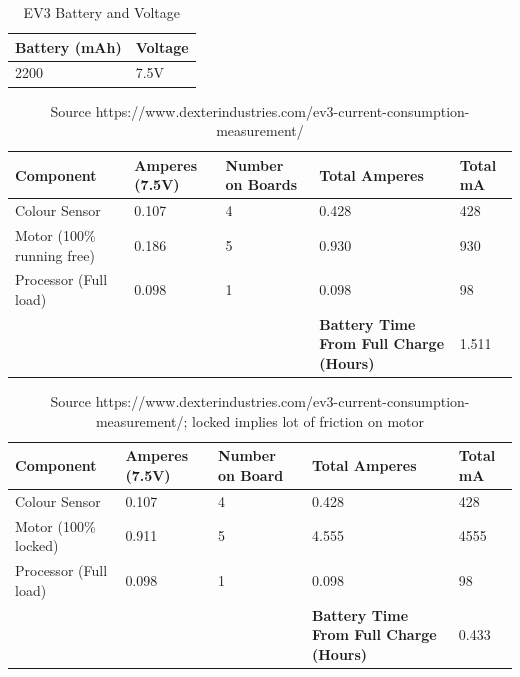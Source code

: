 \documentclass[a4paper]{article}
\begin{document}
\begin{center}
\newpage
\begin{table}[!htb]
\centering
\begin{tabular}{| p{2cm} | p{2cm} |}
\hline
\textbf{Battery (mAh)} & \textbf{Voltage} \\
\hline
2200 & 7.5V \\
\hline
\end{tabular}
\caption{EV3 Battery and Voltage}
\end{table}

\begin{table}[!htb]
\centering
\begin{tabular}{| p{2cm} | p{2cm} | p{2cm} | p{2cm} | p{2cm} |}
\hline
\textbf{Component} & \textbf{Amperes (7.5V)} & \textbf{Number on Boards} & \textbf{Total Amperes} & \textbf{Total mA}\\
\hline
Colour Sensor & 0.107 & 4 & 0.428 & 428 \\
\hline
Motor (100\% running free) & 0.186 & 5 & 0.930 & 930 \\
\hline 
Processor (Full load) & 0.098 & 1 & 0.098 & 98 \\
\hline
 & & & \textbf{Battery Time From Full Charge (Hours)} & 1.511 \\ 
 \hline
\end{tabular}
\caption{Source https://www.dexterindustries.com/ev3-current-consumption-measurement/}
\end{table}

\begin{table}[!htb]
\centering
\begin{tabular}{| p{2cm} | p{2cm} | p{2cm} | p{2cm} | p{2cm} |}
\hline
\textbf{Component} & \textbf{Amperes (7.5V)} & \textbf{Number on Board} & \textbf{Total Amperes} & \textbf{Total mA}\\
\hline
Colour Sensor & 0.107 & 4 & 0.428 & 428 \\
\hline
Motor (100\% locked) & 0.911 & 5 & 4.555 & 4555 \\
\hline 
Processor (Full load) & 0.098 & 1 & 0.098 & 98 \\
\hline
 & & & \textbf{Battery Time From Full Charge (Hours)} & 0.433 \\ 
 \hline
\end{tabular}
\caption{Source https://www.dexterindustries.com/ev3-current-consumption-measurement/; locked implies lot of friction on motor}
\end{table}


\end{center}
\end{document}
